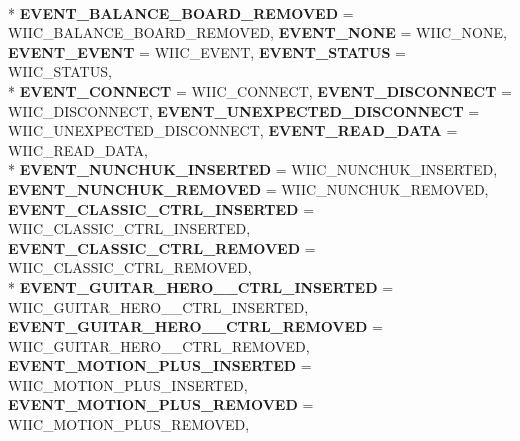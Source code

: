 \begin{DoxyCompactItemize}
\\*
{\bfseries E\-V\-E\-N\-T\-\_\-\-B\-A\-L\-A\-N\-C\-E\-\_\-\-B\-O\-A\-R\-D\-\_\-\-R\-E\-M\-O\-V\-E\-D} =  W\-I\-I\-C\-\_\-\-B\-A\-L\-A\-N\-C\-E\-\_\-\-B\-O\-A\-R\-D\-\_\-\-R\-E\-M\-O\-V\-E\-D, 
{\bfseries E\-V\-E\-N\-T\-\_\-\-N\-O\-N\-E} =  W\-I\-I\-C\-\_\-\-N\-O\-N\-E, 
{\bfseries E\-V\-E\-N\-T\-\_\-\-E\-V\-E\-N\-T} =  W\-I\-I\-C\-\_\-\-E\-V\-E\-N\-T, 
{\bfseries E\-V\-E\-N\-T\-\_\-\-S\-T\-A\-T\-U\-S} =  W\-I\-I\-C\-\_\-\-S\-T\-A\-T\-U\-S, 
\\*
{\bfseries E\-V\-E\-N\-T\-\_\-\-C\-O\-N\-N\-E\-C\-T} =  W\-I\-I\-C\-\_\-\-C\-O\-N\-N\-E\-C\-T, 
{\bfseries E\-V\-E\-N\-T\-\_\-\-D\-I\-S\-C\-O\-N\-N\-E\-C\-T} =  W\-I\-I\-C\-\_\-\-D\-I\-S\-C\-O\-N\-N\-E\-C\-T, 
{\bfseries E\-V\-E\-N\-T\-\_\-\-U\-N\-E\-X\-P\-E\-C\-T\-E\-D\-\_\-\-D\-I\-S\-C\-O\-N\-N\-E\-C\-T} =  W\-I\-I\-C\-\_\-\-U\-N\-E\-X\-P\-E\-C\-T\-E\-D\-\_\-\-D\-I\-S\-C\-O\-N\-N\-E\-C\-T, 
{\bfseries E\-V\-E\-N\-T\-\_\-\-R\-E\-A\-D\-\_\-\-D\-A\-T\-A} =  W\-I\-I\-C\-\_\-\-R\-E\-A\-D\-\_\-\-D\-A\-T\-A, 
\\*
{\bfseries E\-V\-E\-N\-T\-\_\-\-N\-U\-N\-C\-H\-U\-K\-\_\-\-I\-N\-S\-E\-R\-T\-E\-D} =  W\-I\-I\-C\-\_\-\-N\-U\-N\-C\-H\-U\-K\-\_\-\-I\-N\-S\-E\-R\-T\-E\-D, 
{\bfseries E\-V\-E\-N\-T\-\_\-\-N\-U\-N\-C\-H\-U\-K\-\_\-\-R\-E\-M\-O\-V\-E\-D} =  W\-I\-I\-C\-\_\-\-N\-U\-N\-C\-H\-U\-K\-\_\-\-R\-E\-M\-O\-V\-E\-D, 
{\bfseries E\-V\-E\-N\-T\-\_\-\-C\-L\-A\-S\-S\-I\-C\-\_\-\-C\-T\-R\-L\-\_\-\-I\-N\-S\-E\-R\-T\-E\-D} =  W\-I\-I\-C\-\_\-\-C\-L\-A\-S\-S\-I\-C\-\_\-\-C\-T\-R\-L\-\_\-\-I\-N\-S\-E\-R\-T\-E\-D, 
{\bfseries E\-V\-E\-N\-T\-\_\-\-C\-L\-A\-S\-S\-I\-C\-\_\-\-C\-T\-R\-L\-\_\-\-R\-E\-M\-O\-V\-E\-D} =  W\-I\-I\-C\-\_\-\-C\-L\-A\-S\-S\-I\-C\-\_\-\-C\-T\-R\-L\-\_\-\-R\-E\-M\-O\-V\-E\-D, 
\\*
{\bfseries E\-V\-E\-N\-T\-\_\-\-G\-U\-I\-T\-A\-R\-\_\-\-H\-E\-R\-O\-\_\-\_\-\-C\-T\-R\-L\-\_\-\-I\-N\-S\-E\-R\-T\-E\-D} =  W\-I\-I\-C\-\_\-\-G\-U\-I\-T\-A\-R\-\_\-\-H\-E\-R\-O\-\_\-\_\-\-C\-T\-R\-L\-\_\-\-I\-N\-S\-E\-R\-T\-E\-D, 
{\bfseries E\-V\-E\-N\-T\-\_\-\-G\-U\-I\-T\-A\-R\-\_\-\-H\-E\-R\-O\-\_\-\_\-\-C\-T\-R\-L\-\_\-\-R\-E\-M\-O\-V\-E\-D} =  W\-I\-I\-C\-\_\-\-G\-U\-I\-T\-A\-R\-\_\-\-H\-E\-R\-O\-\_\-\_\-\-C\-T\-R\-L\-\_\-\-R\-E\-M\-O\-V\-E\-D, 
{\bfseries E\-V\-E\-N\-T\-\_\-\-M\-O\-T\-I\-O\-N\-\_\-\-P\-L\-U\-S\-\_\-\-I\-N\-S\-E\-R\-T\-E\-D} =  W\-I\-I\-C\-\_\-\-M\-O\-T\-I\-O\-N\-\_\-\-P\-L\-U\-S\-\_\-\-I\-N\-S\-E\-R\-T\-E\-D, 
{\bfseries E\-V\-E\-N\-T\-\_\-\-M\-O\-T\-I\-O\-N\-\_\-\-P\-L\-U\-S\-\_\-\-R\-E\-M\-O\-V\-E\-D} =  W\-I\-I\-C\-\_\-\-M\-O\-T\-I\-O\-N\-\_\-\-P\-L\-U\-S\-\_\-\-R\-E\-M\-O\-V\-E\-D, 

\end{DoxyCompactItemize}
